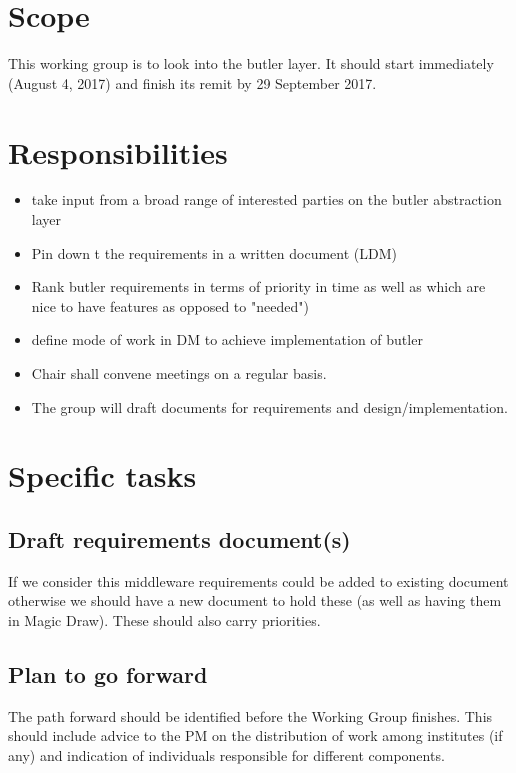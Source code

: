 \section{Scope}

This working group is to look into the butler layer. It should start immediately (August 4, 2017) and finish its remit by 29 September 2017.


\section{Responsibilities}
\begin{itemize}
 \item take input from a broad range of interested parties on the butler abstraction layer
\item Pin down t the requirements in a written document (LDM)
\item  Rank butler requirements in terms of priority in time as well as which are nice to have features as
opposed to "needed")
\item define mode of work in DM to achieve implementation of butler
\item     Chair shall  convene meetings on a regular basis.
\item The group will draft documents for requirements and design/implementation.
\end{itemize}

\section{Specific tasks}

\subsection{ Draft requirements document(s)}
If we consider this middleware requirements could be added to existing document otherwise we should have a new document to hold these (as well as having them in Magic Draw). These should also carry priorities.

\subsection{Plan to go forward}
The path forward should be identified before the Working Group finishes. This should include advice to the PM on the distribution of work among institutes (if any) and indication of individuals responsible for different components.


